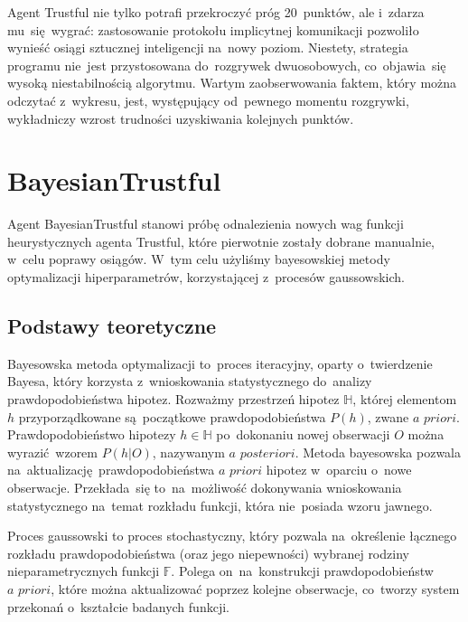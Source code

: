 \documentclass[declaration,shortabstract,inz]{iithesis}
\begin{document}
Agent Trustful nie tylko potrafi przekroczyć próg 20~punktów, ale i~zdarza mu~się~wygrać: zastosowanie protokołu implicytnej komunikacji pozwoliło wynieść osiągi sztucznej inteligencji na~nowy poziom. Niestety, strategia programu nie~jest przystosowana do~rozgrywek dwuosobowych, co~objawia~się wysoką niestabilnością algorytmu. Wartym zaobserwowania faktem, który można odczytać z~wykresu, jest, występujący od~pewnego momentu rozgrywki, wykładniczy wzrost trudności uzyskiwania kolejnych punktów.

\section{BayesianTrustful}

Agent BayesianTrustful stanowi próbę odnalezienia nowych wag funkcji heurystycznych agenta Trustful, które pierwotnie zostały dobrane manualnie, w~celu poprawy osiągów. W~tym celu użyliśmy bayesowskiej metody optymalizacji hiperparametrów, korzystającej z~procesów gaussowskich.

\subsection*{Podstawy teoretyczne}

Bayesowska metoda optymalizacji to~proces iteracyjny, oparty o~twierdzenie Bayesa, który korzysta z~wnioskowania statystycznego do~analizy prawdopodobieństwa hipotez. Rozważmy przestrzeń hipotez $\mathbb{H}$, której elementom $h$ przyporządkowane są~początkowe prawdopodobieństwa $P(h)$, zwane $\textit{a priori}$. Prawdopodobieństwo hipotezy $h\in\mathbb{H}$ po~dokonaniu nowej obserwacji $O$ można wyrazić wzorem $P(h|O)$, nazywanym $\textit{a posteriori}$. Metoda bayesowska pozwala na~aktualizację prawdopodobieństwa $\textit{a priori}$ hipotez w~oparciu o~nowe obserwacje. Przekłada~się to~na~możliwość dokonywania wnioskowania statystycznego na~temat rozkładu funkcji, która nie~posiada wzoru jawnego.

Proces gaussowski to proces stochastyczny, który pozwala na~określenie łącznego rozkładu prawdopodobieństwa (oraz jego niepewności) wybranej rodziny nieparametrycznych funkcji $\mathbb{F}$. Polega on~na~konstrukcji prawdopodobieństw $\textit{a priori}$, które można aktualizować poprzez kolejne obserwacje, co~tworzy system przekonań o~kształcie badanych funkcji.
\end{document}
